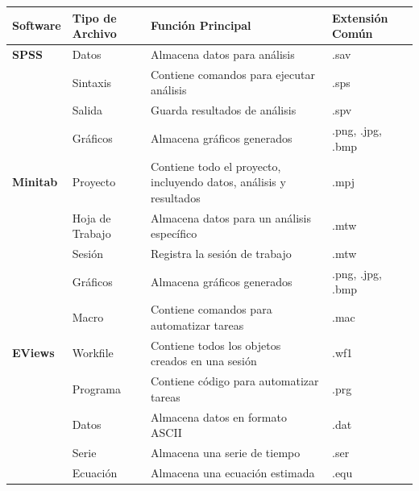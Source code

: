 \documentclass[
  stu,
  floatsintext,
  longtable,
  a4paper,
  nolmodern,
  notxfonts,
  notimes,
  12pt,
  colorlinks=true,linkcolor=blue,citecolor=blue,urlcolor=blue]{apa7}
\newcounter{none} %
\begin{document}
{\def\LTcaptype{none} %
\begin{longtable}[]{@{}
  >{\raggedright\arraybackslash}p{}
  >{\raggedright\arraybackslash}p{}
  >{\raggedright\arraybackslash}p{}
  >{\raggedright\arraybackslash}p{}@{}}
\toprule\noalign{}
\begin{minipage}[b]{\linewidth}\raggedright
Software
\end{minipage} & \begin{minipage}[b]{\linewidth}\raggedright
Tipo de Archivo
\end{minipage} & \begin{minipage}[b]{\linewidth}\raggedright
Función Principal
\end{minipage} & \begin{minipage}[b]{\linewidth}\raggedright
Extensión Común
\end{minipage} \\
\midrule\noalign{}
\endhead
\bottomrule\noalign{}
\endlastfoot
\textbf{SPSS} & Datos & Almacena datos para análisis & .sav \\
& Sintaxis & Contiene comandos para ejecutar análisis & .sps \\
& Salida & Guarda resultados de análisis & .spv \\
& Gráficos & Almacena gráficos generados & .png, .jpg, .bmp \\
\textbf{Minitab} & Proyecto & Contiene todo el proyecto, incluyendo
datos, análisis y resultados & .mpj \\
& Hoja de Trabajo & Almacena datos para un análisis específico & .mtw \\
& Sesión & Registra la sesión de trabajo & .mtw \\
& Gráficos & Almacena gráficos generados & .png, .jpg, .bmp \\
& Macro & Contiene comandos para automatizar tareas & .mac \\
\textbf{EViews} & Workfile & Contiene todos los objetos creados en una
sesión & .wf1 \\
& Programa & Contiene código para automatizar tareas & .prg \\
& Datos & Almacena datos en formato ASCII & .dat \\
& Serie & Almacena una serie de tiempo & .ser \\
& Ecuación & Almacena una ecuación estimada & .equ \\

\end{longtable}}
\end{document}
